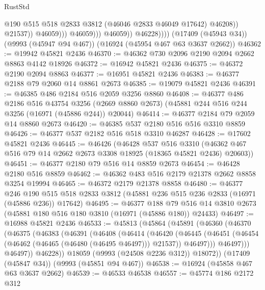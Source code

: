 \begin{lexlean}{RustStd}
\begin{coremodule}
                                    @190
                                    @515
                                    @518
                                    @2833
                                    @3812
                                    (@46046 @2833 @46049 @17642)
                                    @46208))
                                @21537))
                            @46059)))
                      @46059)))
                @46059))
            @46228))))
    (@17409 (@45943 @34))
    (@9993 (@45947 @94 @467))
    (@16924 (@45954 @467 @63 @3637 @2662))
@46362 := @19942 @45821 @2436
@46370 := @46362 @730 @2096 @2190 @2094 @2662 @8863 @4142 @18926
@46372 := @16942 @45821 @2436
@46375 := @46372 @2190 @2094 @8863
@46377 := @16951 @45821 @2436
@46383 := @46377 @2188 @79 @2060 @14 @8861 @2673
@46385 := @19079 @45821 @2436
@46391 := @46385 @486 @2184 @516 @2059 @3256 @8860
@46408 := @46377
    @486
    @2186
    @516
    @43754
    @3256
    (@2669 @8860 @2673)
    (@45881 @244 @516 @244 @3256 (@16971 (@45886 @244)) @20044)
@46414 := @46377 @2184 @79 @2059 @14 @8860 @2673
@46420 := @46385 @537 @2180 @516 @516 @3310 @8859
@46426 := @46377 @537 @2182 @516 @518 @3310 @46287
@46428 := @17602 @45821 @2436
@46445 := @46426
    (@46428
      @537
      @516
      @3310
      (@46362 @467 @516 @79 @14 @2662 @2673 @3308 @18925 (@18365 @45821 @2436) @20603))
@46451 := @46377 @2180 @79 @516 @14 @8859 @2673
@46454 := @46428 @2180 @516 @8859
@46462 := @46362 @483 @516 @2179 @21378 @2662 @8858 @3254 @19994
@46465 := @46372 @2179 @21378 @8858
@46480 := @46377
    @246
    @190
    @515
    @518
    @2833
    @3812
    (@45881 @236 @515 @236 @2833 (@16971 (@45886 @236)) @17642)
@46495 := @46377
    @188
    @79
    @516
    @14
    @3810
    @2673
    (@45881 @180 @516 @180 @3810 (@16971 (@45886 @180)) @24433)
@46497 := @16988 @45821 @2436
@46533 := @45813
    (@45864
      (@45891
        (@46360
          (@46370
            (@46375
              (@46383
                (@46391
                  (@46408
                    (@46414
                      (@46420
                        (@46445
                          (@46451
                            (@46454 (@46462 (@46465 (@46480 (@46495 @46497))) @21537))
                            @46497)))
                      @46497)))
                @46497))
            @46228))
        @18059
        (@9993 (@24508 @2236 @312))
        @18072))
    (@17409 (@45847 @34))
    (@9993 (@45851 @94 @467))
@46538 := @16924 (@45858 @467 @63 @3637 @2662)
@46539 := @46533 @46538
@46557 := @45774
    @186
    @2172
    @312

\end{coremodule}
\end{lexlean}

